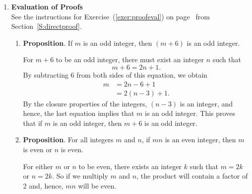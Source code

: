 \begin{enumerate}
\item \textbf{Evaluation of Proofs}  \hfill \\
See the instructions for Exercise~(\ref{exer:proofeval}) on 
page~\pageref{exer:proofeval} from Section~\ref{S:directproof}.

\begin{enumerate}
\item \textbf{Proposition}. If $m$ is an odd integer, then $\left(m + 6\right)$ is an odd integer.

\begin{myproof}
For $m + 6$ to be an odd integer, there must exist an integer $n$ such that
\[
m + 6 = 2n + 1.
\]
By subtracting 6 from both sides of this equation, we obtain %
\[
\begin{aligned}
m &= 2n - 6 + 1 \\
  &= 2 \left(n - 3 \right) + 1.
\end{aligned}
\]
By the closure properties of the integers, $\left(n - 3 \right)$ is an integer, and hence, the last equation implies that $m$ is an odd integer.  This proves that if $m$ is an odd integer, then $m+6$ is an odd integer.
\end{myproof}

\item \textbf{Proposition}. For all integers $m$ and $n$, if $mn$ is an even integer, then $m$ is even or $n$ is even.

\begin{myproof}
For either $m$ or $n$ to be even, there exists an integer $k$ such that $m = 2k$ or $n = 2k$.  So if we multiply $m$ and $n$, the product will contain a factor of 2 and, hence, $mn$ will be even.
\end{myproof}
\end{enumerate}
\end{enumerate}



